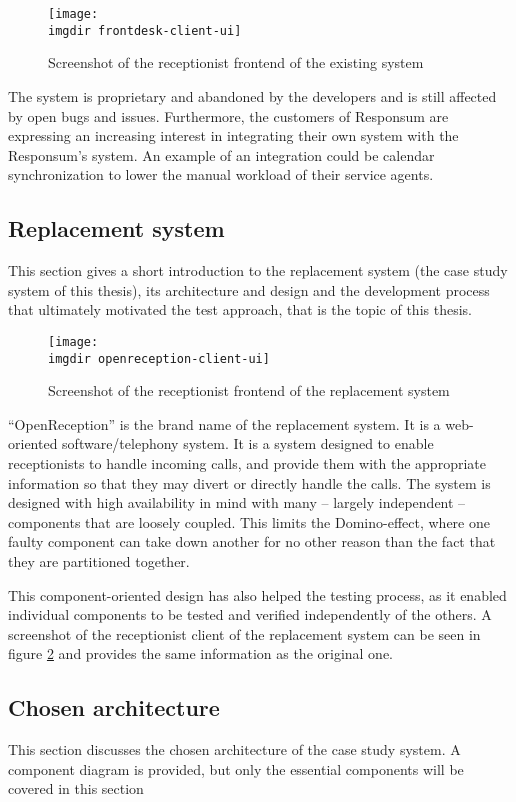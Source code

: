 \begin{figure}[!hbpt]
\centering
\texttt{[image: \\imgdir frontdesk-client-ui]}
\caption{Screenshot of the receptionist frontend of the existing system}
\label{fig:frontdesk-client-ui}
\end{figure}

\noindent The system is proprietary and abandoned by the developers and is still affected by open bugs and issues. Furthermore, the customers of Responsum are expressing an increasing interest in integrating their own system with the Responsum's system. An example of an integration could be calendar synchronization to lower the manual workload of their service agents.

\subsection{Replacement system}
This section gives a short introduction to the replacement system (the case study system of this thesis), its architecture and design and the development process that ultimately motivated the test approach, that is the topic of this thesis.\medskip

\begin{figure}[!hbpt]
\centering
\texttt{[image: \\imgdir openreception-client-ui]}
\caption{Screenshot of the receptionist frontend of the replacement system}
\label{fig:openreception-client-ui}
\end{figure}

\noindent
``OpenReception'' is the brand name of the replacement system. It is a web-oriented software/telephony system. It is a system designed to enable receptionists to handle incoming calls, and provide them with the appropriate information so that they may divert or directly handle the calls. The system is designed with high availability in mind with many -- largely independent -- components that are loosely coupled. This limits the Domino-effect, where one faulty component can take down another for no other reason than the fact that they are partitioned together.\medskip

\noindent This component-oriented design has also helped the testing process, as it enabled individual components to be tested and verified independently of the others. A screenshot of the receptionist client of the replacement system can be seen in figure \ref{fig:openreception-client-ui} and provides the same information as the original one.

\subsection{Chosen architecture}
This section discusses the chosen architecture of the case study system. A component diagram is provided, but only the essential components will be covered in this section\medskip

